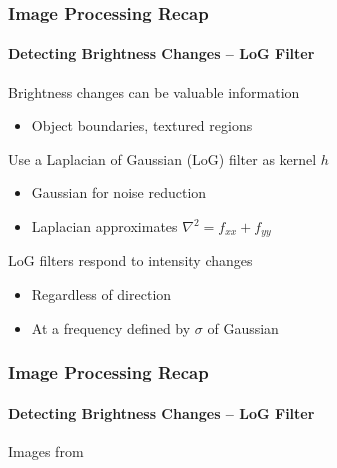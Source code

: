 \documentclass[xetex,professionalfont]{beamer}
\begin{document}

\begin{frame}
\frametitle{Image Processing Recap}
\framesubtitle{Detecting Brightness Changes -- LoG Filter}

Brightness changes can be valuable information
\begin{itemize}
    \item Object boundaries, textured regions
\end{itemize}

\bigskip
Use a Laplacian of Gaussian (LoG) filter as kernel $h$ %
\begin{itemize}
    \item Gaussian for noise reduction
    \item Laplacian approximates $\nabla^2=f_{xx}+f_{yy}$ %
\end{itemize}

\bigskip
LoG filters respond to intensity changes %
\begin{itemize}
    \item Regardless of direction
    \item At a frequency defined by $\sigma$ of Gaussian
\end{itemize}

\end{frame}


\begin{frame}
\frametitle{Image Processing Recap}
\framesubtitle{Detecting Brightness Changes -- LoG Filter}

\begin{center}
    {\centering Images from \cite{prince12}}
\end{center}

\end{frame}
\end{document}
